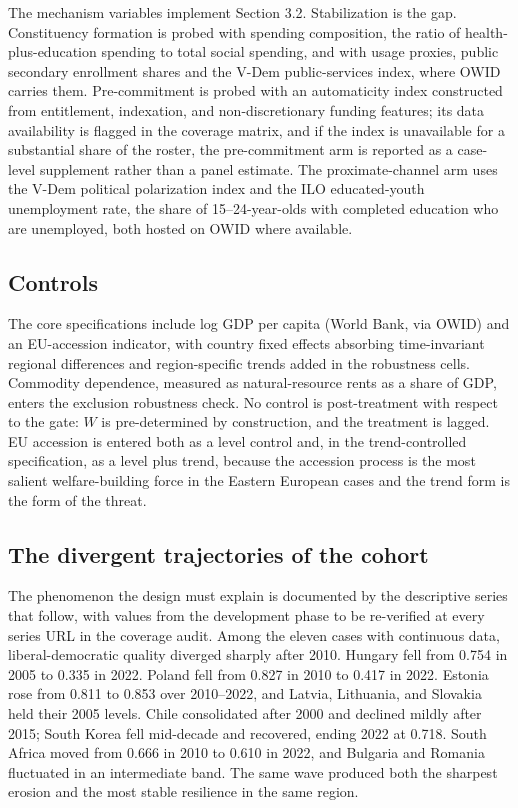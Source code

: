 The mechanism variables implement Section 3.2. Stabilization is the gap. Constituency formation is probed with spending composition, the ratio of health-plus-education spending to total social spending, and with usage proxies, public secondary enrollment shares and the V-Dem public-services index, where OWID carries them. Pre-commitment is probed with an automaticity index constructed from entitlement, indexation, and non-discretionary funding features; its data availability is flagged in the coverage matrix, and if the index is unavailable for a substantial share of the roster, the pre-commitment arm is reported as a case-level supplement rather than a panel estimate. The proximate-channel arm uses the V-Dem political polarization index and the ILO educated-youth unemployment rate, the share of 15--24-year-olds with completed education who are unemployed, both hosted on OWID where available.

\subsection{Controls}

The core specifications include log GDP per capita (World Bank, via OWID) and an EU-accession indicator, with country fixed effects absorbing time-invariant regional differences and region-specific trends added in the robustness cells. Commodity dependence, measured as natural-resource rents as a share of GDP, enters the exclusion robustness check. No control is post-treatment with respect to the gate: $W$ is pre-determined by construction, and the treatment is lagged. EU accession is entered both as a level control and, in the trend-controlled specification, as a level plus trend, because the accession process is the most salient welfare-building force in the Eastern European cases and the trend form is the form of the threat.

\subsection{The divergent trajectories of the cohort}

The phenomenon the design must explain is documented by the descriptive series that follow, with values from the development phase to be re-verified at every series URL in the coverage audit. Among the eleven cases with continuous data, liberal-democratic quality diverged sharply after 2010. Hungary fell from 0.754 in 2005 to 0.335 in 2022. Poland fell from 0.827 in 2010 to 0.417 in 2022. Estonia rose from 0.811 to 0.853 over 2010--2022, and Latvia, Lithuania, and Slovakia held their 2005 levels. Chile consolidated after 2000 and declined mildly after 2015; South Korea fell mid-decade and recovered, ending 2022 at 0.718. South Africa moved from 0.666 in 2010 to 0.610 in 2022, and Bulgaria and Romania fluctuated in an intermediate band. The same wave produced both the sharpest erosion and the most stable resilience in the same region.

